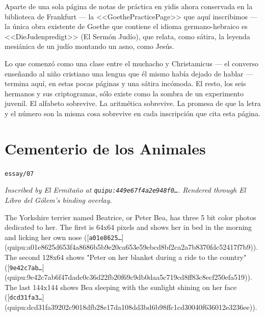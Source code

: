 \documentclass[11pt,openany]{book}
\begin{document}
Aparte de una sola página de notas de práctica en yidis ahora conservada en la biblioteca de Frankfurt — la <<GoethePracticePage>> que aquí inscribimos — la única obra existente de Goethe que contiene el idioma germano-hebraico es <<DieJudenpredigt>> (El Sermón Judío), que relata, como sátira, la leyenda mesiánica de un judío montando un asno, como Jesús.

Lo que comenzó como una clase entre el muchacho y Christamicus — el converso enseñando al niño cristiano una lengua que él mismo había dejado de hablar — termina aquí, en estas pocas páginas y una sátira incómoda. El resto, los seis hermanos y sus criptogramas, sólo existe como la sombra de un experimento juvenil. El alfabeto sobrevive. La aritmética sobrevive. La promesa de que la letra y el número son la misma cosa sobrevive en cada inscripción que cita esta página.


\clearpage
\chapter*{Cementerio de los Animales}
\noindent\textcolor{soft}{\small\texttt{essay/07}}\par\vspace{0.5em}
\noindent\itshape\small\textcolor{soft}{Inscribed by El Ermita\~no at \texttt{quipu:449e67f4a2e948f0\ldots}. Rendered through \emph{El Libro del G\'olem}'s binding overlay.}\normalfont\par\vspace{0.8em}
The Yorkshire terrier named Beatrice, or Peter Bea, has three 5 bit color photos dedicated to her. The first is 64x64 pixels and shows her in bed in the morning and licking her own nose ([\texttt{a01e8625…}](quipu:a01e8625d653f4a8686b5b9e20ca653e59ebcd8bf2ca2a7b8370fdc52417f7b9)). The second 128x64 shows "Peter on her blanket during a ride to the country" ([\texttt{9e42c7ab…}](quipu:9e42c7ab6f47dadc0c36d22fb20f69c9db0daa5c719cd8ff83c8ecf250efa519)). The last 144x144 shows Bea sleeping with the sunlight shining on her face ([\texttt{dcd31fa3…}](quipu:dcd31fa39202c9018dfb28e17da108dd3bd6b98ffc1cd30040f636012e3236ee)).
\end{document}
